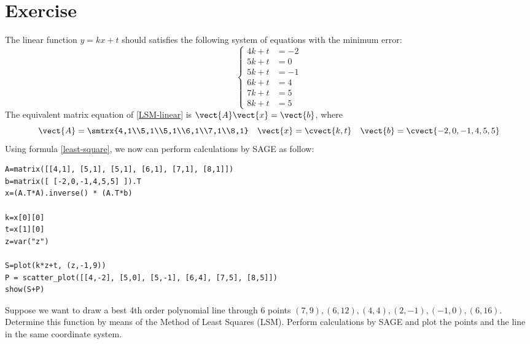 \section{Exercise}
\begin{solution}\label{least-square}
The linear function $y=kx+t$ should satisfies the following system of equations with the minimum error:
\begin{equation}
\label{LSM-linear}
\begin{cases}
4k+t &= -2 \\
5k+t &= 0 \\
5k+t &= -1 \\
6k+t &= 4 \\
7k+t &= 5 \\
8k+t &= 5 
\end{cases}
\end{equation}
The equivalent matrix equation of \eqref{LSM-linear} is $\vect{A}\vect{x}=\vect{b}$, where
\[ \vect{A}=\smtrx{4,1\\5,1\\5,1\\6,1\\7,1\\8,1} \quad \vect{x}=\cvect{k,t} \quad \vect{b}=\cvect{-2,0,-1,4,5,5} \]
Using formula \eqref{least-square}, we now can perform calculations by SAGE as follow:
\begin{verbatim}
A=matrix([[4,1], [5,1], [5,1], [6,1], [7,1], [8,1]])
b=matrix([ [-2,0,-1,4,5,5] ]).T
x=(A.T*A).inverse() * (A.T*b)

k=x[0][0]
t=x[1][0]
z=var("z")

S=plot(k*z+t, (z,-1,9))
P = scatter_plot([[4,-2], [5,0], [5,-1], [6,4], [7,5], [8,5]])
show(S+P)
\end{verbatim}
\end{solution}

\begin{exercise}
Suppose we want to draw a best 4th order polynomial line through 6 points $(7,9),(6,12),(4,4),(2,-1),(-1,0),(6,16)$. Determine this function by means of the Method of Least Squares (LSM). Perform calculations by SAGE and plot the points and the line in the same coordinate system.
\end{exercise}

